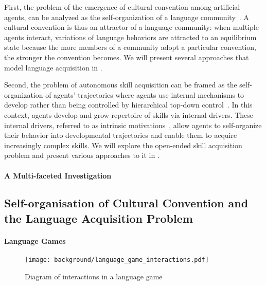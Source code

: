  First, the problem of the emergence of cultural convention among artificial agents, can be analyzed as the self-organization of a language community~\citep{steels1995selforganizing,oudeyer2005selforganization}. A cultural convention is thus an attractor of a language community: when multiple agents interact, variations of language behaviors are attracted to an equilibrium state because the more members of a community adopt a particular convention, the stronger the convention becomes. We will present several approaches that model language acquisition in . 

Second, the problem of autonomous skill acquisition can be framed as the self-organization of agents' trajectories where agents use internal mechanisms to develop rather than being controlled by hierarchical top-down control~\citep{pfeifer2007robotics}. In this context, agents develop and grow repertoire of skills via internal drivers. These internal drivers, referred to as intrinsic motivations~\citep{oudeyer2005selforganization}, allow agents to self-organize their behavior into developmental trajectories and enable them to acquire increasingly complex skills. We will explore the open-ended skill acquisition problem and present various approaches to it in .


\paragraph{A Multi-faceted Investigation}




\subsection{Self-organisation of Cultural Convention and the Language Acquisition Problem}
\label{sec:self-orga-lang}


\paragraph{Language Games}

\begin{figure}[!h]
\centering
\texttt{[image: background/language\_game\_interactions.pdf]}	
\caption{Diagram of interactions in a language game}
\label{fig:language_game_interactions}
\end{figure}

